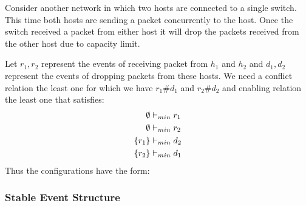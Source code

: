 \begin{example}
    Consider another network in which two hosts are connected
    to a single switch.
    This time both hosts are sending a packet concurrently to the
    host.
    Once the switch received a packet from either host it will
    drop the packets received from the other host due to capacity
    limit.
    \begin{center}
    \end{center}
    Let $r_1,r_2$ represent the events of receiving packet from
    $h_1$ and $h_2$ and $d_1,d_2$ represent the events of dropping
    packets from these hosts.
    We need a conflict relation the least one for which we have
    $r_1\#d_1$ and $r_2\#d_2$
    and enabling relation the least one that satisfies:
    \begin{align*}
        \emptyset & \vdash_{min} r_1 \\
        \emptyset & \vdash_{min} r_2 \\
        \{r_1\}   & \vdash_{min} d_2 \\
        \{r_2\}   & \vdash_{min} d_1 \\
    \end{align*}
    Thus the configurations have the form:
    \begin{center}
    \end{center}
\end{example}

\subsubsection*{Stable Event Structure}

